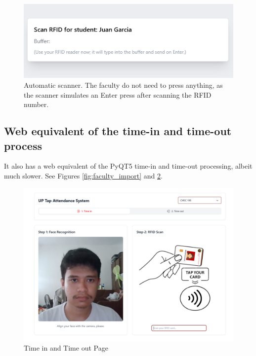 \begin{figure}[h] %
	\centering
	\includegraphics[width=1\textwidth]{figures/chapter4/batch_rfid_scan.png} %
	\caption{Automatic scanner. The faculty do not need to press anything, as the scanner simulates an Enter press after scanning the RFID number.}
	\label{fig:batch_rfid_scan}
\end{figure}
\clearpage
\subsection{Web equivalent of the time-in and time-out process}
It also has a web equivalent of the PyQT5 time-in and time-out processing, albeit much slower. See Figures \ref{fig:faculty_import} and \ref{fig:frontend}.
\begin{figure}[h] %
	\centering
	\includegraphics[width=1.0\textwidth]{figures/chapter4/frontend.png} %
	\caption{Time in and Time out Page}
	\label{fig:frontend}
\end{figure}

